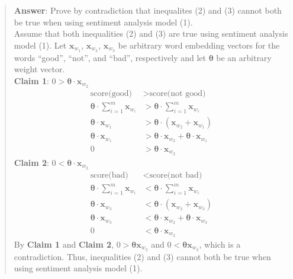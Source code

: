 \begin{quote}
{\bf Answer}: Prove by contradiction that inequalites (2) and (3) cannot both be true when using sentiment analysis model (1). \\

    Assume that both inequalities (2) and (3) are true using sentiment analysis model (1).
    Let $\textbf{x}_{w_1}$, $\textbf{x}_{w_2}$, $\textbf{x}_{w_3}$ be arbitrary word embedding vectors for the words ``good'', ``not'', and ``bad'', respectively and let $\mathbf{\theta}$ be an arbitrary weight vector. \\

    {\bf Claim 1}: $0 > \mathbf{\theta} \cdot \textbf{x}_{w_2}$
    \begin{align*}
	\textrm{score(good)} &> \textrm{score(not good)} \\
	\mathbf{\theta} \cdot \sum_{i=1}^{m} \textbf{x}_{w_i} &> \mathbf{\theta} \cdot \sum_{i=1}^{m} \textbf{x}_{w_i} \\
	\mathbf{\theta} \cdot \textbf{x}_{w_1} &> \mathbf{\theta} \cdot \left( \textbf{x}_{w_2} + \textbf{x}_{w_1} \right) \\
	\mathbf{\theta} \cdot \textbf{x}_{w_1} &> \mathbf{\theta} \cdot \textbf{x}_{w_2} + \mathbf{\theta} \cdot \textbf{x}_{w_1} \\
	0 &> \mathbf{\theta} \cdot \textbf{x}_{w_2}
     \end{align*}
    {\bf Claim 2}: $0 < \mathbf{\theta} \cdot \textbf{x}_{w_2}$
    \begin{align*}
	\textrm{score(bad)} &< \textrm{score(not bad)} \\
	\mathbf{\theta} \cdot \sum_{i=1}^{m} \textbf{x}_{w_i} &< \mathbf{\theta} \cdot \sum_{i=1}^{m} \textbf{x}_{w_i} \\
	\mathbf{\theta} \cdot \textbf{x}_{w_3} &< \mathbf{\theta} \cdot \left( \textbf{x}_{w_2} + \textbf{x}_{w_3} \right) \\
	\mathbf{\theta} \cdot \textbf{x}_{w_3} &< \mathbf{\theta} \cdot \textbf{x}_{w_2} + \mathbf{\theta} \cdot \textbf{x}_{w_3} \\
	0 &< \mathbf{\theta} \cdot \textbf{x}_{w_2}
    \end{align*}
    By {\bf Claim 1} and {\bf Claim 2}, $0 > \mathbf{\theta} \textbf{x}_{w_2}$ and $0 < \mathbf{\theta} \textbf{x}_{w_2}$, which is a contradiction. Thus, inequalities (2) and (3) cannot both be true when using sentiment analysis model (1).
\end{quote}
